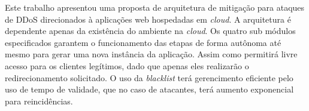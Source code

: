 
Este trabalho apresentou uma proposta de arquitetura de mitigação para ataques de DDoS direcionados à aplicações web hospedadas em \emph{cloud}. A arquitetura é dependente apenas da existência do ambiente na \emph{cloud}. Os quatro sub módulos especificados garantem o funcionamento das etapas de forma autônoma até mesmo para gerar uma nova instância da aplicação. Assim como permitirá livre acesso para os clientes legítimos, dado que apenas eles realizarão o redirecionamento solicitado. O uso da \emph{blacklist} terá gerencimento eficiente pelo uso de tempo de validade, que no caso de atacantes, terá aumento exponencial para reincidências.

